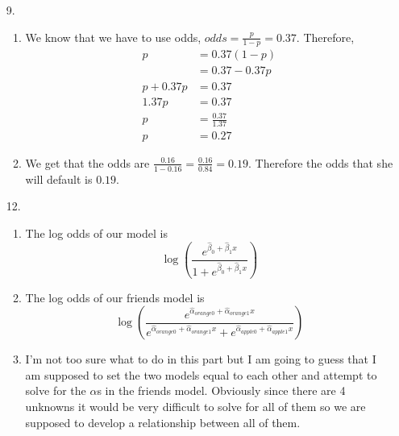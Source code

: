 \documentclass{article}
\begin{document}
\begin{enumerate}
    \item [9.]
    
    \begin{enumerate}
        \item 
        
        We know that we have to use odds, $odds = \frac{p}{1-p} = 0.37.$ Therefore,
        \begin{align*}
            p &= 0.37(1-p)\\
            &= 0.37-0.37p\\
            p + 0.37p &= 0.37\\
            1.37p &= 0.37\\
            p &= \frac{0.37}{1.37}\\
            p &= 0.27
        \end{align*}
        
        \item
        
        We get that the odds are $\frac{0.16}{1-0.16} = \frac{0.16}{0.84} = 0.19$. Therefore the odds that she will default is $0.19.$
        
    \end{enumerate}
    
    \item [12.]
    
    \begin{enumerate}
        \item 
        
        The log odds of our model is \[\log(\frac{e^{\hat{\beta}_0 + \hat{\beta}_1x}}{1+e^{\hat{\beta}_0 + \hat{\beta}_1x}})\]
        
        \item
        
        The log odds of our friends model is \[
        \log(\frac{e^{\hat{\alpha}_{orange0} + \hat{\alpha}_{orange1}x}}{e^{\hat{\alpha}_{orange0} + \hat{\alpha}_{orange1}x} + e^{\hat{\alpha}_{apple0} + \hat{\alpha}_{apple1}x}})
        \]
        
        \item
        
        I'm not too sure what to do in this part but I am going to guess that I am supposed to set the two models equal to each other and attempt to solve for the $\alpha$s in the friends model. Obviously since there are 4 unknowns it would be very difficult to solve for all of them so  we are supposed to develop a relationship between all of them.
        

\end{enumerate}
\end{enumerate}
\end{document}
